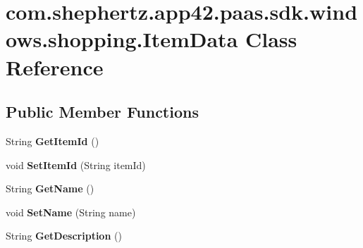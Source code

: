 \hypertarget{classcom_1_1shephertz_1_1app42_1_1paas_1_1sdk_1_1windows_1_1shopping_1_1_item_data}{\section{com.\+shephertz.\+app42.\+paas.\+sdk.\+windows.\+shopping.\+Item\+Data Class Reference}
\label{classcom_1_1shephertz_1_1app42_1_1paas_1_1sdk_1_1windows_1_1shopping_1_1_item_data}
}
\subsection*{Public Member Functions}
\begin{DoxyCompactItemize}
\item 
\hypertarget{classcom_1_1shephertz_1_1app42_1_1paas_1_1sdk_1_1windows_1_1shopping_1_1_item_data_aa526bea4c8e15a4af4cb1aeb4314d616}{String {\bfseries Get\+Item\+Id} ()}\label{classcom_1_1shephertz_1_1app42_1_1paas_1_1sdk_1_1windows_1_1shopping_1_1_item_data_aa526bea4c8e15a4af4cb1aeb4314d616}

\item 
\hypertarget{classcom_1_1shephertz_1_1app42_1_1paas_1_1sdk_1_1windows_1_1shopping_1_1_item_data_a70072bc1e2bda8efad63c5b42a6a5066}{void {\bfseries Set\+Item\+Id} (String item\+Id)}\label{classcom_1_1shephertz_1_1app42_1_1paas_1_1sdk_1_1windows_1_1shopping_1_1_item_data_a70072bc1e2bda8efad63c5b42a6a5066}

\item 
\hypertarget{classcom_1_1shephertz_1_1app42_1_1paas_1_1sdk_1_1windows_1_1shopping_1_1_item_data_a6f01cdd4b00ec76d0f2d2343dcd515d5}{String {\bfseries Get\+Name} ()}\label{classcom_1_1shephertz_1_1app42_1_1paas_1_1sdk_1_1windows_1_1shopping_1_1_item_data_a6f01cdd4b00ec76d0f2d2343dcd515d5}

\item 
\hypertarget{classcom_1_1shephertz_1_1app42_1_1paas_1_1sdk_1_1windows_1_1shopping_1_1_item_data_af9a00ed8f34f93b325289d174992713f}{void {\bfseries Set\+Name} (String name)}\label{classcom_1_1shephertz_1_1app42_1_1paas_1_1sdk_1_1windows_1_1shopping_1_1_item_data_af9a00ed8f34f93b325289d174992713f}

\item 
\hypertarget{classcom_1_1shephertz_1_1app42_1_1paas_1_1sdk_1_1windows_1_1shopping_1_1_item_data_a6ce7dfdc11d20d670ff2edabead50363}{String {\bfseries Get\+Description} ()}\label{classcom_1_1shephertz_1_1app42_1_1paas_1_1sdk_1_1windows_1_1shopping_1_1_item_data_a6ce7dfdc11d20d670ff2edabead50363}


\end{DoxyCompactItemize}

